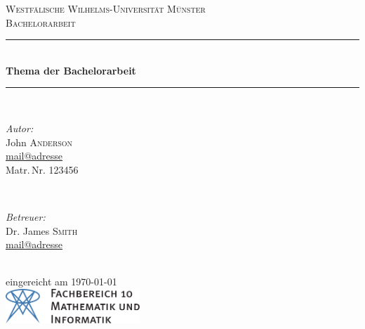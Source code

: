 \begin{titlepage}
	\newcommand{\HRule}{\rule{\linewidth}{0.5mm}} %

	\center %
 

	\textsc{\LARGE Westfälische Wilhelms-Universität Münster}\\[1.5cm] %
	\textsc{\Large Bachelorarbeit}\\[0.5cm] %


	\HRule \\[0.4cm]
	
	{\onehalfspacing\huge\sffamily\bfseries Thema der Bachelorarbeit \singlespacing} %
	\vspace{-0.4cm}
	\HRule \\[1.5cm] 
	

	\begin{minipage}[t]{0.4\textwidth}
	\begin{flushleft} \large
	\emph{Autor:}\\
	John \textsc{Anderson}\\ %
	\normalsize \url{mail@adresse}\\
	Matr.\,Nr. 123456
	\end{flushleft}
	\end{minipage}
	~
	\begin{minipage}[t]{0.4\textwidth}
	\begin{flushright} \large
	\emph{Betreuer:} \\
	Dr. James \textsc{Smith}\\ %
	\normalsize \url{mail@adresse}
	\end{flushright}
	\end{minipage}\\[4cm]

	{\large eingereicht am \today}\\[3cm] %


	\includegraphics[height=1.3cm,keepaspectratio]{Bilder/fb10logo.pdf}\\[1cm] %
 

	\vfill %
	
\end{titlepage}